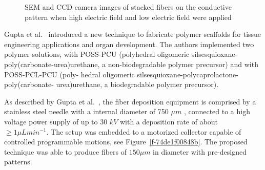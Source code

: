 \documentclass[5p,,preprint,12pt,twocolumn]{elsarticle}
\makeatletter
\def\fixFloatSize#1{}%
\makeatother
\begin{document}
\bgroup
\fixFloatSize{images/3c862704-5da9-4ed0-8616-d8562e9cc5f0-ukim_01.png}
\begin{figure}[!htbp]
\centering \makeatletter{}
\makeatother 
\caption{{SEM and CCD camera images of stacked fibers on the conductive pattern when high electric field and low electric field were applied}}
\label{f-24b5148e8358}
\end{figure}
\egroup
Gupta et al.\unskip~\cite{527120:11974310} introduced a new technique to fabricate polymer scaffolds for tissue engineering applications and organ development. The authors implemented two polymer solutions, with POSS-PCU (polyhedral oligomeric silsesquioxane-poly(carbonate-urea)urethane, a non-biodegradable polymer precursor) and with POSS-PCL-PCU (poly- hedral oligomeric silsesquioxane-polycaprolactone-poly(carbonate- urea)urethane, a biodegradable polymer precursor).

As described by Gupta et al.\unskip~\cite{527120:11974310}, the fiber deposition equipment is comprised by a stainless steel needle with a internal diameter of 750 $\mu m $ , connected to a high voltage power supply of up to 30 $k V $ with a deposition rate of about $\geq 1 \mu L min^{-1} $. The setup was embedded to a motorized collector capable of controlled programmable motions, see Figure~\ref{f-74de1f00848b}. The proposed technique was able to produce fibers of $150 \mu m $ in diameter with pre-designed patterns.
\end{document}
